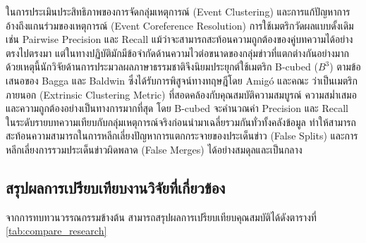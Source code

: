 ในการประเมินประสิทธิภาพของการจัดกลุ่มเหตุการณ์ (Event Clustering) และการแก้ปัญหาการอ้างถึงแกนร่วมของเหตุการณ์ (Event Coreference Resolution) การใช้เมตริกวัดผลแบบดั้งเดิม เช่น Pairwise Precision และ Recall แม้ว่าจะสามารถสะท้อนความถูกต้องของคู่บทความได้อย่างตรงไปตรงมา แต่ในทางปฏิบัติมักมีข้อจำกัดด้านความไวต่อขนาดของกลุ่มข่าวที่แตกต่างกันอย่างมาก ด้วยเหตุนี้นักวิจัยด้านการประมวลผลภาษาธรรมชาติจึงนิยมประยุกต์ใช้เมตริก B-cubed ($B^3$) ตามข้อเสนอของ Bagga และ Baldwin \cite{bagga1998algorithms} ซึ่งได้รับการพิสูจน์ทางทฤษฎีโดย Amigó และคณะ \cite{amigo2009comparison} ว่าเป็นเมตริกภายนอก (Extrinsic Clustering Metric) ที่สอดคล้องกับคุณสมบัติความสมบูรณ์ ความสม่ำเสมอ และความถูกต้องอย่างเป็นทางการมากที่สุด โดย B-cubed จะคำนวณค่า Precision และ Recall ในระดับรายบทความเทียบกับกลุ่มเหตุการณ์จริงก่อนนำมาเฉลี่ยรวมกันทั่วทั้งคลังข้อมูล ทำให้สามารถสะท้อนความสามารถในการหลีกเลี่ยงปัญหาการแตกกระจายของประเด็นข่าว (False Splits) และการหลีกเลี่ยงการรวมประเด็นข่าวผิดพลาด (False Merges) ได้อย่างสมดุลและเป็นกลาง

\subsection{สรุปผลการเปรียบเทียบงานวิจัยที่เกี่ยวข้อง}

จากการทบทวนวรรณกรรมข้างต้น สามารถสรุปผลการเปรียบเทียบคุณสมบัติได้ดังตารางที่ \ref{tab:compare_research}


\begin{table}[H]
\centering
\caption{เปรียบเทียบงานวิจัยที่เกี่ยวข้อง}
\label{tab:compare_research}
\end{table}

